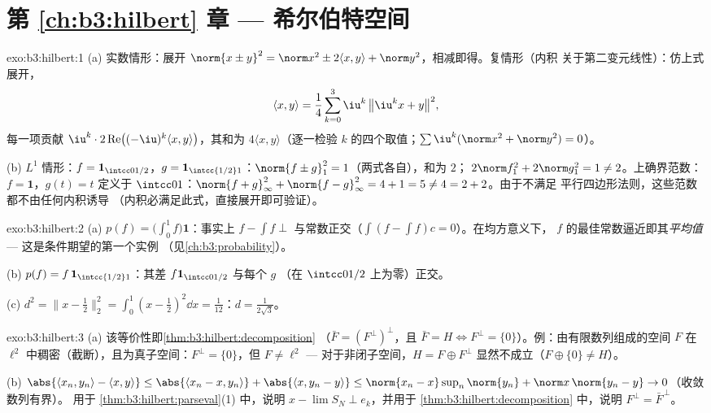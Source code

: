 \section*{第 \ref{ch:b3:hilbert} 章 --- 希尔伯特空间}

\begin{solution}{exo:b3:hilbert:1}
(a) 实数情形：展开 $\norm{x \pm y}^2 = \norm x^2 \pm 2\langle
x,y\rangle + \norm y^2$，相减即得。复情形（内积
关于第二变元线性）：仿上式展开，
\[
\langle x, y\rangle = \frac14\sum_{k=0}^{3}
\iu^k\,\bigl\|\iu^kx + y\bigr\|^2,
\]
每一项贡献 $\iu^k\cdot2\operatorname{Re}\bigl(
(-\iu)^k\langle x,y\rangle\bigr)$，其和为 $4\langle
x,y\rangle$（逐一检验 $k$ 的四个取值；$\sum\iu^k
(\norm x^2 + \norm y^2) = 0$）。

(b) $L^1$ 情形：$f = \mathbf 1_{\intcc0{1/2}}$，$g = \mathbf
1_{\intcc{1/2}1}$：$\norm{f\pm g}_1^2 = 1$（两式各自），和为 $2$；
$2\norm f_1^2 + 2\norm g_1^2 = 1 \neq 2$。上确界范数：$f =
\mathbf 1$，$g(t) = t$ 定义于 $\intcc01$：$\norm{f + g}_\infty^2 +
\norm{f-g}_\infty^2 = 4 + 1 = 5 \neq 4 = 2 + 2$。由于不满足
平行四边形法则，这些范数都不由任何内积诱导
（内积必满足此式，直接展开即可验证）。
\end{solution}

\begin{solution}{exo:b3:hilbert:2}
(a) $p(f) = \bigl(\int_0^1f\bigr)\mathbf 1$：事实上 $f - \int f
\perp$ 与常数正交（$\int(f - \int f)c = 0$）。在均方意义下，
$f$ 的最佳常数逼近即其\emph{平均值} ---
这是条件期望的第一个实例
（见\cref{ch:b3:probability}）。

(b) $p(f) = f\,\mathbf 1_{\intcc{1/2}1}$：其差
$f\mathbf 1_{\intcc0{1/2}}$ 与每个 $g$
（在 $\intcc0{1/2}$ 上为零）正交。

(c) $d^2 = \bigl\|x - \tfrac12\bigr\|_2^2 = \int_0^1(x -
\tfrac12)^2\dd x = \tfrac1{12}$：$d = \frac1{2\sqrt3}$。
\end{solution}

\begin{solution}{exo:b3:hilbert:3}
(a) 该等价性即\cref{thm:b3:hilbert:decomposition}
（$\bar F = (F^\perp)^\perp$，且 $\bar F = H \iff F^\perp =
\{0\}$）。例：由有限数列组成的空间 $F$ 在
$\ell^2$ 中稠密（截断），且为真子空间：$F^\perp = \{0\}$，但 $F
\neq \ell^2$ --- 对于非闭子空间，$H = F \oplus
F^\perp$ 显然不成立（$F \oplus \{0\} \neq H$）。

(b) $\abs{\langle x_n, y_n\rangle - \langle x, y\rangle} \leq
\abs{\langle x_n - x, y_n\rangle} + \abs{\langle x, y_n -
y\rangle} \leq \norm{x_n - x}\sup_n\norm{y_n} + \norm
x\,\norm{y_n - y} \to 0$（收敛数列有界）。
用于 \cref{thm:b3:hilbert:parseval}(1) 中，说明 $x - \lim
S_N \perp e_k$，并用于 \cref{thm:b3:hilbert:decomposition}
中，说明 $F^\perp = \bar F^{\,\perp}$。
\end{solution}

